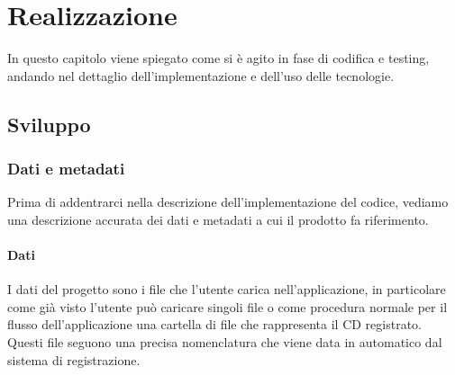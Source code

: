 
\chapter{Realizzazione}
\label{cap:realizzazione}
In questo capitolo viene spiegato come si è agito in fase di codifica e testing, andando nel dettaglio dell'implementazione e dell'uso delle tecnologie.

\section{Sviluppo}

\subsection{Dati e metadati}
Prima di addentrarci nella descrizione dell'implementazione del codice, vediamo una descrizione accurata dei dati e metadati a cui il prodotto fa riferimento.
\subsubsection{Dati}
I dati del progetto sono i file che l'utente carica nell'applicazione, in particolare come già visto l'utente può caricare singoli file o come procedura normale per il flusso dell'applicazione
una cartella di file che rappresenta il CD registrato.
Questi file seguono una precisa nomenclatura che viene data in automatico dal sistema di registrazione.
